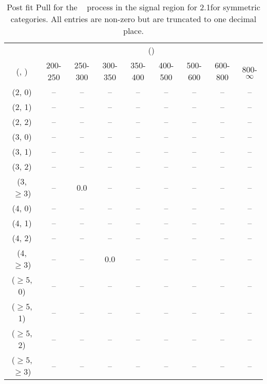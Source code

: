 \begin{table}[h!]
\tiny
\centering
\caption{Post fit Pull for the \zInv~ process in the signal region for 2.1\ifb for symmetric categories. All entries are non-zero but are truncated to one decimal place.\label{tab:pullseppost_sig_zinv_sym}}
\begin{tabular}
{ccccccccc}
	\hline\hline
	& \multicolumn{8}{c}{\scalht (\gev)} \\ 
	 (\njet,  \nb) & 200-250 & 250-300 & 300-350 & 350-400 & 400-500 & 500-600 & 600-800 & 800-$\infty$ \\ [0.8ex] 
\hline
	(2, 0) & -- & -- & -- & -- & -- & -- & -- & -- \\[0.5ex] 
	(2, 1) & -- & -- & -- & -- & -- & -- & -- & -- \\[0.5ex] 
	(2, 2) & -- & -- & -- & -- & -- & -- & -- & -- \\[0.5ex] 
	(3, 0) & -- & -- & -- & -- & -- & -- & -- & -- \\[0.5ex] 
	(3, 1) & -- & -- & -- & -- & -- & -- & -- & -- \\[0.5ex] 
	(3, 2) & -- & -- & -- & -- & -- & -- & -- & -- \\[0.5ex] 
	(3, $\ge3$) & -- & 0.0 & -- & -- & -- & -- & -- & -- \\[0.5ex] 
	(4, 0) & -- & -- & -- & -- & -- & -- & -- & -- \\[0.5ex] 
	(4, 1) & -- & -- & -- & -- & -- & -- & -- & -- \\[0.5ex] 
	(4, 2) & -- & -- & -- & -- & -- & -- & -- & -- \\[0.5ex] 
	(4, $\ge3$) & -- & -- & 0.0 & -- & -- & -- & -- & -- \\[0.5ex] 
	($\ge5$, 0) & -- & -- & -- & -- & -- & -- & -- & -- \\[0.5ex] 
	($\ge5$, 1) & -- & -- & -- & -- & -- & -- & -- & -- \\[0.5ex] 
	($\ge5$, 2) & -- & -- & -- & -- & -- & -- & -- & -- \\[0.5ex] 
	($\ge5$, $\ge3$) & -- & -- & -- & -- & -- & -- & -- & -- \\[0.5ex] 
	\hline
	\hline
\end{tabular}
\end{table}
